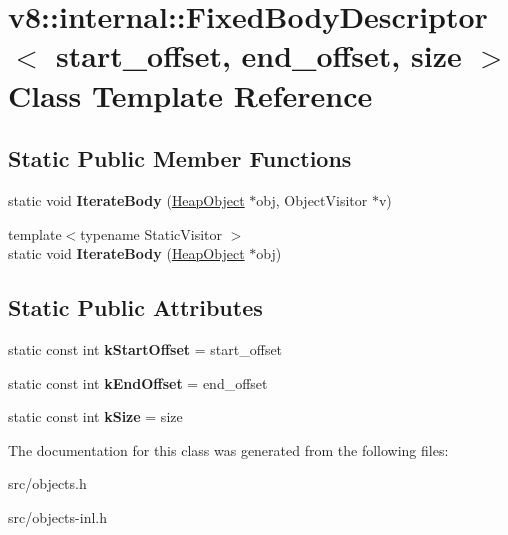 \hypertarget{classv8_1_1internal_1_1_fixed_body_descriptor}{}\section{v8\+:\+:internal\+:\+:Fixed\+Body\+Descriptor$<$ start\+\_\+offset, end\+\_\+offset, size $>$ Class Template Reference}
\label{classv8_1_1internal_1_1_fixed_body_descriptor}
\subsection*{Static Public Member Functions}
\begin{DoxyCompactItemize}
\item 
\hypertarget{classv8_1_1internal_1_1_fixed_body_descriptor_a09f2cb0fa168f74bca449c9ffd4a32f7}{}static void {\bfseries Iterate\+Body} (\hyperlink{classv8_1_1internal_1_1_heap_object}{Heap\+Object} $\ast$obj, Object\+Visitor $\ast$v)\label{classv8_1_1internal_1_1_fixed_body_descriptor_a09f2cb0fa168f74bca449c9ffd4a32f7}

\item 
\hypertarget{classv8_1_1internal_1_1_fixed_body_descriptor_a83ffec194bc75217d2178e3fad22dc73}{}{\footnotesize template$<$typename Static\+Visitor $>$ }\\static void {\bfseries Iterate\+Body} (\hyperlink{classv8_1_1internal_1_1_heap_object}{Heap\+Object} $\ast$obj)\label{classv8_1_1internal_1_1_fixed_body_descriptor_a83ffec194bc75217d2178e3fad22dc73}

\end{DoxyCompactItemize}
\subsection*{Static Public Attributes}
\begin{DoxyCompactItemize}
\item 
\hypertarget{classv8_1_1internal_1_1_fixed_body_descriptor_a1c2c5b9bd26b6d92dc7c86f4c54db927}{}static const int {\bfseries k\+Start\+Offset} = start\+\_\+offset\label{classv8_1_1internal_1_1_fixed_body_descriptor_a1c2c5b9bd26b6d92dc7c86f4c54db927}

\item 
\hypertarget{classv8_1_1internal_1_1_fixed_body_descriptor_a5cfa9c5d4e9f97129ac63145e583a7ae}{}static const int {\bfseries k\+End\+Offset} = end\+\_\+offset\label{classv8_1_1internal_1_1_fixed_body_descriptor_a5cfa9c5d4e9f97129ac63145e583a7ae}

\item 
\hypertarget{classv8_1_1internal_1_1_fixed_body_descriptor_a03c0893d55c2985366e4d64060bae196}{}static const int {\bfseries k\+Size} = size\label{classv8_1_1internal_1_1_fixed_body_descriptor_a03c0893d55c2985366e4d64060bae196}

\end{DoxyCompactItemize}


The documentation for this class was generated from the following files\+:\begin{DoxyCompactItemize}
\item 
src/objects.\+h\item 
src/objects-\/inl.\+h\end{DoxyCompactItemize}
